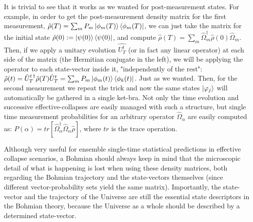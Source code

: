 \documentclass[11pt, a4paper]{article} %
\begin{document}
It is trivial to see that it works as we wanted for post-measurement states. For example, in order to get the post-measurement density matrix for the first measurement, $\hat{\rho}(T) = \sum_m P_m\ket{\phi_m(T)}\bra{\phi_m(T)}$, we can just take the matrix for the initial state $\hat{\rho}(0):=\ket{\psi(0)}\bra{\psi(0)}$, and compute $\hat{\rho}(T)=\sum_m \hat{\Omega}_m^\dagger\hat{\rho}(0)\hat{\Omega}_m$. Then, if we apply a unitary evolution $\hat{U_T^t}$ (or in fact any linear operator) at each side of the matrix (the Hermitian conjugate in the left), we will be applying the operator to each state-vector inside it, "independently of the rest": $\hat{\rho}(t)=\hat{U}_T^{t\,\dagger}\hat{\rho}(T)\hat{U}_T^{t}=\sum_m P_m\ket{\phi_m(t)}\bra{\phi_k(t)}$. Just as we wanted. Then, for the second measurement we repeat the trick and now the same states $\ket{\varphi_j}$ will automatically be gathered in a single ket-bra. Not only the time evolution and successive effective-collapses are easily managed with such a structure, but single time measurement probabilities for an arbitrary operator $\hat{\Omega}_\alpha$ are easily computed as: $P(\alpha)=tr[\hat{\Omega}_\alpha^\dagger \hat{\Omega}_\alpha\hat{\rho}]$, where $tr$ is the trace operation.

Although very useful for ensemble single-time statistical predictions in effective collapse scenarios, a Bohmian should always keep in mind that the microscopic detail of what is happening is lost when using these density matrices, both regarding the Bohmian trajectory and the state-vectors themselves (since different vector-probability sets yield the same matrix). Importantly, the state-vector and the trajectory of the Universe are still the essential state descriptors in the Bohmian theory, because the Universe as a whole should be described by a determined state-vector.
\end{document}
